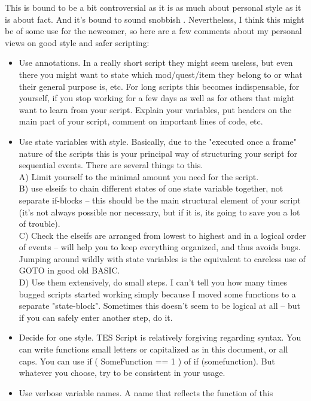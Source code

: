 This is bound to be a bit controversial as it is as much about personal
style as it is about fact. And it's bound to sound snobbish .
Nevertheless, I think this might be of some use for the newcomer, so
here are a few comments about my personal views on good style and safer
scripting:

\begin{itemize}
\item
  Use annotations. In a really short script they might seem useless, but
  even there you might want to state which mod/quest/item they belong to
  or what their general purpose is, etc. For long scripts this becomes
  indispensable, for yourself, if you stop working for a few days as
  well as for others that might want to learn from your script. Explain
  your variables, put headers on the main part of your script, comment
  on important lines of code, etc.
\item
  Use state variables with style. Basically, due to the "executed once a
  frame" nature of the scripts this is your principal way of structuring
  your script for sequential events. There are several things to this.\\
  A) Limit yourself to the minimal amount you need for the script.\\
  B) use elseifs to chain different states of one state variable
  together, not separate if-blocks -- this should be the main structural
  element of your script (it's not always possible nor necessary, but if
  it is, its going to save you a lot of trouble).\\
  C) Check the elseifs are arranged from lowest to highest and in a
  logical order of events -- will help you to keep everything organized,
  and thus avoids bugs. Jumping around wildly with state variables is
  the equivalent to careless use of GOTO in good old BASIC.\\
  D) Use them extensively, do small steps. I can't tell you how many
  times bugged scripts started working simply because I moved some
  functions to a separate "state-block". Sometimes this doesn't seem to
  be logical at all -- but if you can safely enter another step, do it.
\item
  Decide for one style. TES Script is relatively forgiving regarding
  syntax. You can write functions small letters or capitalized as in
  this document, or all caps. You can use if ( SomeFunction == 1 ) of if
  (somefunction). But whatever you choose, try to be consistent in your
  usage.
\item
  Use verbose variable names. A name that reflects the function of this

\end{itemize}
